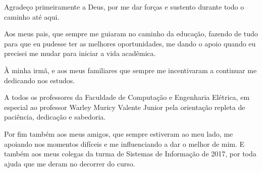 
\begin{agradecimentos}[AGRADECIMENTOS]

Agradeço primeiramente a Deus, por me dar forças e sustento durante todo o caminho até aqui.

Aos meus pais, que sempre me guiaram no caminho da educação, fazendo de tudo para que eu pudesse ter as melhores oportunidades, me dando o apoio quando eu precisei me mudar para iniciar a vida acadêmica.

À minha irmã, e aos meus familiares que sempre me incentivaram a continuar me dedicando nos estudos.

A todos os professores da Faculdade de Computação e Engenharia Elétrica, em especial ao professor Warley Muricy Valente Junior pela orientação repleta de paciência, dedicação e sabedoria.

Por fim também aos meus amigos, que sempre estiveram ao meu lado, me apoiando nos momentos difíceis e me influenciando a dar o melhor de mim. E também aos meus colegas da turma de Sistemas de Informação de 2017, por toda ajuda que me deram no decorrer do curso.

\end{agradecimentos}
